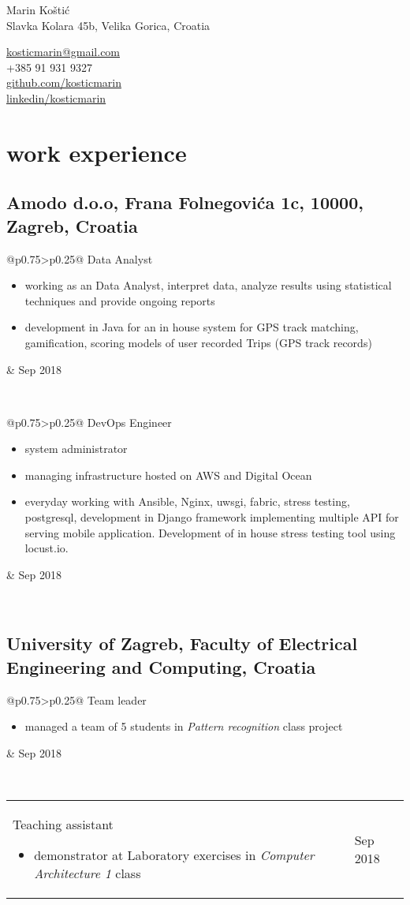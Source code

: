 \documentclass[a4paper]{article}
\makeatletter
\newlength{\tablewidth}
\newenvironment{period}[2]{%
\newcommand{\sarma}{#2}%
\setlength{\tablewidth}{\linewidth}
\addtolength{\tablewidth}{-2\tabcolsep}
\begin{tabular}{@{}p{0.75\tablewidth}>{\raggedleft\arraybackslash}p{0.25\tablewidth}@{}}%
#1 \newline
\begin{itemize}
}{%
\end{itemize} & \sarma \\%
\end{tabular}\\
}
\makeatother
\begin{document}
\fontfamily{\sfdefault}
\selectfont

\begin{minipage}{.5\textwidth}
\LARGE{Marin Koštić}\\
\normalsize{Slavka Kolara 45b, Velika Gorica, Croatia}
\end{minipage}%
\begin{minipage}{.5\textwidth}
\raggedleft
\href{mailto:kosticmarin@gmail.com}{kosticmarin@gmail.com}\\
+385 91 931 9327 \\
\href{https://github.com/kosticmarin}{github.com/kosticmarin}\\
\href{https://www.linkedin.com/in/marin-koštić-495949155}{linkedin/kosticmarin}
\end{minipage}

\vspace{1em}

\section{work experience}
\subsection{Amodo d.o.o, Frana Folnegovića 1c, 10000, Zagreb, Croatia}
\begin{period}{Data Analyst}{Sep 2018}
	\item working as an Data Analyst, interpret data, analyze results using statistical techniques and provide ongoing reports
	\item development in Java for an in house system for GPS track matching, gamification, scoring models of user recorded Trips (GPS track records)
\end{period}
\begin{period}{DevOps Engineer}{Jul 2017 -- Sep 2018}
	\item system administrator
	\item managing infrastructure hosted on AWS and Digital Ocean
	\item everyday working with Ansible, Nginx, uwsgi, fabric, stress testing, postgresql, development in Django framework implementing multiple API for serving
	mobile application. Development of in house stress testing tool using locust.io.
\end{period}
\subsection{University of Zagreb, Faculty of Electrical Engineering and Computing, Croatia}
\begin{period}{Team leader}{Sep 2016 -- Jan 2017}
    \item managed a team of 5 students in \textit{Pattern recognition} class project
\end{period}
\begin{period}{Teaching assistant}{Jan 2015 -- May 2015}
	\item demonstrator at Laboratory exercises in \textit{Computer Architecture 1} class
\end{period}
\end{document}
